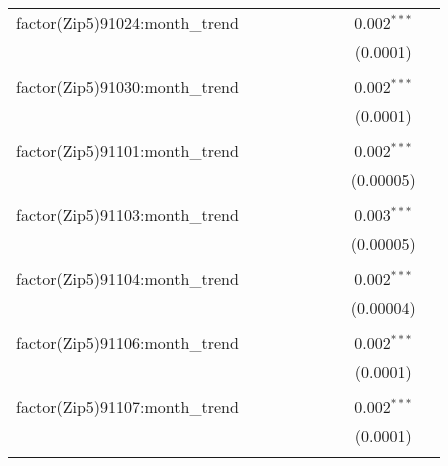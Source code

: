 \begin{table}[H]
{\begin{tabular}{@{\extracolsep{5pt}}lcccccccc}
  factor(Zip5)91024:month\_trend &  &  &  &  &  &  & 0.002$^{***}$ &  \\  

   &  &  &  &  &  &  & (0.0001) &  \\  

   & & & & & & & & \\  

  factor(Zip5)91030:month\_trend &  &  &  &  &  &  & 0.002$^{***}$ &  \\  

   &  &  &  &  &  &  & (0.0001) &  \\  

   & & & & & & & & \\  

  factor(Zip5)91101:month\_trend &  &  &  &  &  &  & 0.002$^{***}$ &  \\  

   &  &  &  &  &  &  & (0.00005) &  \\  

   & & & & & & & & \\  

  factor(Zip5)91103:month\_trend &  &  &  &  &  &  & 0.003$^{***}$ &  \\  

   &  &  &  &  &  &  & (0.00005) &  \\  

   & & & & & & & & \\  

  factor(Zip5)91104:month\_trend &  &  &  &  &  &  & 0.002$^{***}$ &  \\  

   &  &  &  &  &  &  & (0.00004) &  \\  

   & & & & & & & & \\  

  factor(Zip5)91106:month\_trend &  &  &  &  &  &  & 0.002$^{***}$ &  \\  

   &  &  &  &  &  &  & (0.0001) &  \\  

   & & & & & & & & \\  

  factor(Zip5)91107:month\_trend &  &  &  &  &  &  & 0.002$^{***}$ &  \\  

   &  &  &  &  &  &  & (0.0001) &  \\  

   & & & & & & & & \\  


\end{tabular}}
\end{table}
